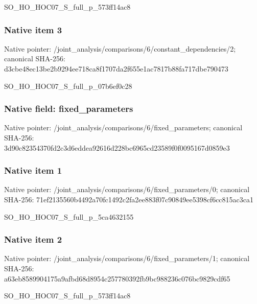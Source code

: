 \documentclass[10pt,a4paper]{article}
\begin{document}
\begingroup\raggedright\sloppy SO\_\allowbreak{}HO\_\allowbreak{}HOC07\_\allowbreak{}S\_\allowbreak{}full\_\allowbreak{}p\_\allowbreak{}573ff14ac8\par\endgroup

\subsubsection{Native item 3}
Native pointer: /joint\_\allowbreak{}analysis/comparisons/6/constant\_\allowbreak{}dependencies/2; canonical SHA-256: d3cbe48ec13be2b9294ee718ca8f1707da2f655e1ac7817b88fa717dbe790473

\begingroup\raggedright\sloppy SO\_\allowbreak{}HO\_\allowbreak{}HOC07\_\allowbreak{}S\_\allowbreak{}full\_\allowbreak{}p\_\allowbreak{}07b6ef0c28\par\endgroup

\subsubsection{Native field: fixed\_\allowbreak{}parameters}
Native pointer: /joint\_\allowbreak{}analysis/comparisons/6/fixed\_\allowbreak{}parameters; canonical SHA-256: 3d90c82354370fd2c3d6eddea92616d228bc6965cd23589f0f0095167d0859e3

\subsubsection{Native item 1}
Native pointer: /joint\_\allowbreak{}analysis/comparisons/6/fixed\_\allowbreak{}parameters/0; canonical SHA-256: 71ef2135560b4492a70fc1492c2fa2ee883f07c90849ee5398cf6cc815ac3ca1

\begingroup\raggedright\sloppy SO\_\allowbreak{}HO\_\allowbreak{}HOC07\_\allowbreak{}S\_\allowbreak{}full\_\allowbreak{}p\_\allowbreak{}5ca4632155\par\endgroup

\subsubsection{Native item 2}
Native pointer: /joint\_\allowbreak{}analysis/comparisons/6/fixed\_\allowbreak{}parameters/1; canonical SHA-256: a63eb8589904175a9afbd68d8954c257780392fb9bc988236c076bc9829cdf65

\begingroup\raggedright\sloppy SO\_\allowbreak{}HO\_\allowbreak{}HOC07\_\allowbreak{}S\_\allowbreak{}full\_\allowbreak{}p\_\allowbreak{}573ff14ac8\par\endgroup
\end{document}
